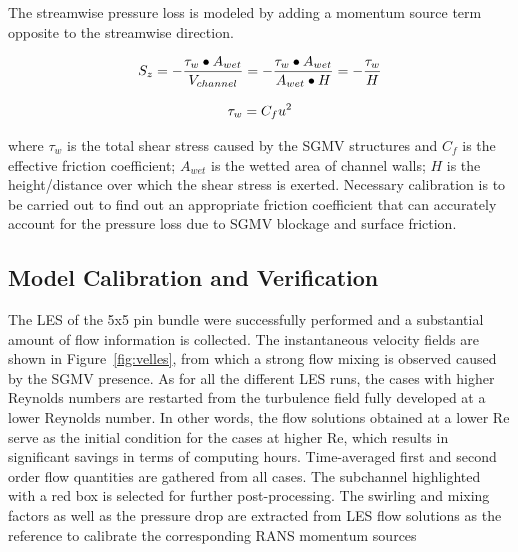 The streamwise pressure loss is modeled by adding a momentum source term opposite to the streamwise direction. 

\begin{equation}
  S_z = -\frac{\tau_w \bullet A_{wet}}{V_{channel}}=-\frac{\tau_w \bullet A_{wet}}{A_{wet} \bullet H}=-\frac{\tau_w}{H}\\
\end{equation}

\begin{equation}
  \tau_w = C_fu^2\\
\end{equation}

where $\tau_w$ is the total shear stress caused by the SGMV structures and 
$C_f$ is the effective friction coefficient; 
$A_{wet}$ is the wetted area of channel walls; 
$H$ is the height/distance over which the shear stress is exerted.
Necessary calibration is to be carried out to find out an appropriate friction coefficient that can accurately account for the pressure loss due to SGMV blockage and surface friction.


\subsection{Model Calibration and Verification}
\label{sec:msm3}

The LES of the 5x5 pin bundle were successfully performed and a substantial amount of flow information is collected. 
The instantaneous velocity fields are shown in Figure~\ref{fig:velles}, from which a strong flow mixing is observed caused by the SGMV presence. 
As for all the different LES runs, the cases with higher Reynolds numbers are restarted from the turbulence field fully developed at a lower Reynolds number. 
In other words, the flow solutions obtained at a lower Re serve as the initial condition for the cases at higher Re, which results in significant savings in terms of computing hours. 
Time-averaged first and second order flow quantities are gathered from all cases. 
The subchannel highlighted with a red box is selected for further post-processing. The swirling and mixing factors as well as the pressure drop are extracted from LES flow solutions as the reference to calibrate the corresponding RANS momentum sources

